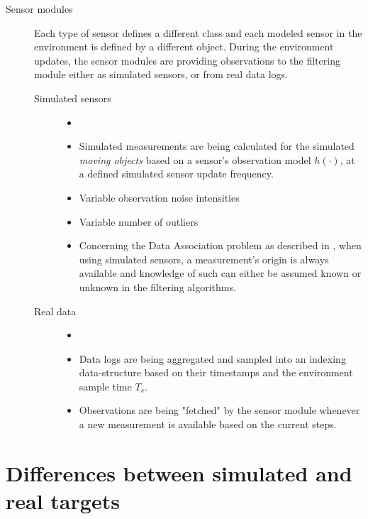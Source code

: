 \begin{description}
	\item[Sensor modules] Each type of sensor defines a different class and each modeled sensor in the environment is defined by a different object. During the environment updates, the sensor modules are providing observations to the filtering module either as simulated sensors, or from real data logs.
	\begin{description}
		\item[Simulated sensors]
		\begin{itemize}
			\item[]
			\item Simulated measurements are being calculated for the simulated \emph{moving objects} based on a sensor's observation model $h(\cdot)$, at a defined simulated sensor update frequency.
			\item Variable observation noise intensities \measnoise
			\item Variable number of outliers
			\item Concerning the Data Association problem as described in , when using simulated sensors, a measurement's origin is always available and knowledge of such can either be assumed known or unknown in the filtering algorithms.
		\end{itemize}
		\item[Real data]
				\begin{itemize}
					\item[]
					\item Data logs are being aggregated and sampled into an indexing data-structure based on their timestamps and the environment sample time $T_s$.
					\item Observations are being "fetched" by the sensor module whenever a new measurement is available based on the current steps.
				\end{itemize}
		
	\end{description}
\end{description}

	
	
\section{Differences between simulated and real targets}

